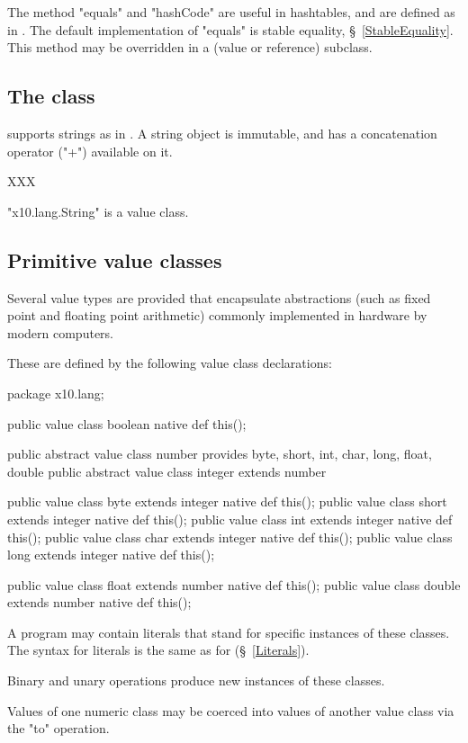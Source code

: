 The method \xcd"equals" and \xcd"hashCode" are useful in hashtables,
and are defined as in \java. The default implementation of \xcd"equals"
is stable equality, \S~\ref{StableEquality}. This method may be overridden
in a (value or reference) subclass.

\subsection{The class }
\Xten{} supports strings as in \java{}. A string object is immutable,
and has a concatenation operator (\xcd"+")  available on it.

XXX

\xcd"x10.lang.String" is a value class.


\subsection{Primitive value classes}

Several value types are provided that encapsulate
abstractions (such as fixed point and floating point arithmetic)
commonly implemented in hardware by modern computers.

These are defined by the following value class declarations:
\begin{xten}
package x10.lang;

public value class boolean { native def this(); }

public abstract value class number
    provides byte, short, int, char, long, float, double { }
public abstract value class integer extends number { }

public value class byte extends integer  { native def this(); }
public value class short extends integer { native def this(); }
public value class int extends integer   { native def this(); }
public value class char extends integer  { native def this(); }
public value class long extends integer  { native def this(); }

public value class float extends number  { native def this(); }
public value class double extends number { native def this(); }
\end{xten}

A program may contain literals
that stand for specific instances of these classes. The syntax
for literals is the same as for \java{} (\S~\ref{Literals}).

Binary and unary operations produce new instances of these
classes.

Values of one numeric class may be coerced into values of
another value class via the \xcd"to" operation.

